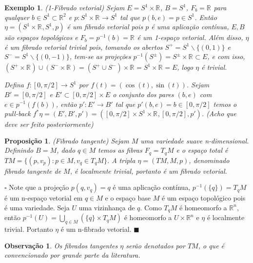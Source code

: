 \documentclass[12pt]{book}
\newtheorem{exemplo}[teorema]{Exemplo}
\newtheorem{observacao}[teorema]{Observação}
\newtheorem{proposicao}[teorema]{Proposição}
\newenvironment{prova}[1]{$\square$ #1}{\hfill$\blacksquare$}
\newcommand{\real}[1]{\mathbb{R}^{#1}}
\newcommand{\alerta}[1]{{\color{red}#1}}
\begin{document}
	\begin{exemplo}
		(1-Fibrado vetorial) Sejam $E=S^{1} \times \real{}$, $B=S^{1}$, $F_{b} = \real{}$ para qualquer $b \in S^{1}\subset \real{2}$ e $p:S^{1} \times \real{}\to S^{1}$ tal que $p(b, e)=p \in S^{1}$. Então $\eta=(S^{1} \times \real{}, S^{1}, p)$ é um fibrado vetorial pois $p$ é uma aplicação contínua, $E, B$ são espaços topológicos e $F_{b} = p^{-1}(b) = \real{}$ é um 1-espaço vetorial. Além disso, $\eta$ é um fibrado vetorial trivial pois, tomando os abertos $S^{+} = S^{1} \backslash \{(0,1)\}$ e $S^{-} = S^{1} \backslash \{(0,-1)\}$, tem-se as projeções $p^{-1}(S^{\pm}) = S^{\pm} \times \real{} \subset E$, e com isso, $(S^{+}\times\real{}) \cup ( S^{-}\times\real{}) = (S^{+}\cup S^{-})\times\real{} = S^{1} \times\real{} =E$, logo $\eta$ é trivial. 
		
		\alerta{
			Defina $f:[0,\pi/2] \to S^{1}$ por $f(t) = (\cos(t), \sin(t))$. Sejam $B' =[0,\pi/2]$ e $E' \subset [0,\pi/2]\times E$ o conjunto dos pares $(b, e)$ com $e \in p^{-1}(f(b))$, então $p': E'\to B'$ tal que $p'(b, e) = b \in [0,\pi/2]$ temos o pull-back $f^{*}\eta = (E', B', p') = ([0,\pi/2]\times S^{1}\times \real{}, [0,\pi/2], p')$. (Acho que deve ser feito posteriormente)}
	\end{exemplo}
	
	\begin{proposicao}
		(Fibrado tangente) Sejam $M$ uma variedade suave n-dimensional. Definindo $B=M$, dado $q\in M$ temos as fibras $F_{q} = T_{q}M$ e o espaço total é $TM=\{(p, v_{p}): p\in M, v_{q}\in T_{q}M \}$. A tripla $\eta = (TM, M, p)$, denominado fibrado tangente de $M$, é localmente trivial, portanto é um fibrado vetorial.
	\end{proposicao}
	\begin{prova}
		Note que a projeção $p(q,v_{q}) = q$ é uma aplicação contínua, $p^{-1}(\{q\}) = T_{q}M$ é um n-espaço vetorial em $q\in M$ e  o espaço base $M$ é um espaço topológico pois é uma variedade. Seja $U$ uma vizinhança de $q$. Como $T_{q}M$ é homeomorfo a $\real{n}$, então $p^{-1}(U) = \bigcup_{q\in M}(\{q\}\times T_{q}M)$ é homeomorfo a $U\times \real{n}$ e $\eta$ é localmente trivial. Portanto $\eta$ é um n-fibrado vetorial.
	\end{prova}
	
	\begin{observacao}
		Os fibrados tangentes $\eta$ serão denotados por $TM$, o que é convencionado por grande parte da literatura.
	\end{observacao}
	
\end{document}
